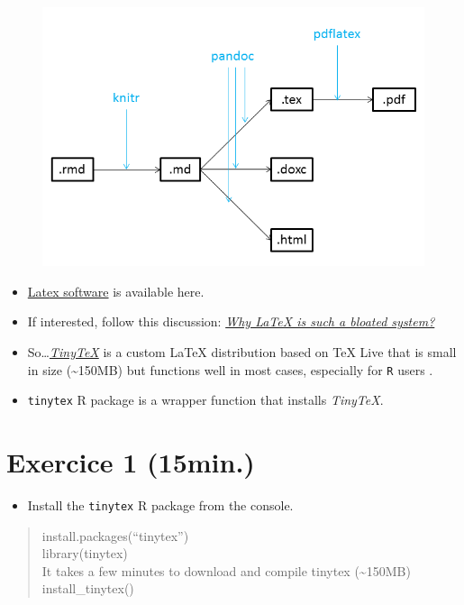 \documentclass[]{article}
\providecommand{\tightlist}{%
  \setlength{\itemsep}{0pt}\setlength{\parskip}{0pt}}
\begin{document}
\begin{figure}
\centering
\includegraphics[width=5.20833in]{../figures/pandoc1.png}
\caption{}
\end{figure}

\begin{itemize}
\item
  \href{https://www.latex-project.org/get/}{Latex software} is available
  here.
\item
  If interested, follow this discussion:
  \href{https://ubuntuforums.org/showthread.php?t=395863}{\emph{Why
  LaTeX is such a bloated system?}}
\item
  So\ldots{}\href{https://yihui.name/tinytex/r/}{\emph{TinyTeX}} is a
  custom LaTeX distribution based on TeX Live that is small in size
  (\textasciitilde{}150MB) but functions well in most cases, especially
  for \texttt{R} users .
\item
  \texttt{tinytex} R package is a wrapper function that installs
  \emph{TinyTeX}.
\end{itemize}

\section{Exercice 1 (15min.)}\label{exercice-1-15min.}

\begin{itemize}
\tightlist
\item
  Install the \texttt{tinytex} R package from the console.
\end{itemize}

\begin{quote}
install.packages(``tinytex'')\\
library(tinytex)\\
It takes a few minutes to download and compile tinytex
(\textasciitilde{}150MB)\\
install\_tinytex()
\end{quote}
\end{document}
